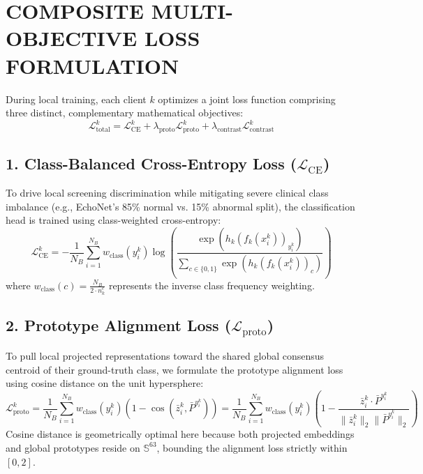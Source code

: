\documentclass[12pt,a4paper]{amritareport}
\begin{document}
\section{COMPOSITE MULTI-OBJECTIVE LOSS FORMULATION}

During local training, each client $k$ optimizes a joint loss function comprising three distinct, complementary mathematical objectives:
\begin{equation}
	\mathcal{L}_{\text{total}}^k = \mathcal{L}_{\text{CE}}^k + \lambda_{\text{proto}} \mathcal{L}_{\text{proto}}^k + \lambda_{\text{contrast}} \mathcal{L}_{\text{contrast}}^k
\end{equation}

\subsection{1. Class-Balanced Cross-Entropy Loss ($\mathcal{L}_{\text{CE}}$)}
To drive local screening discrimination while mitigating severe clinical class imbalance (e.g., EchoNet's 85\% normal vs. 15\% abnormal split), the classification head is trained using class-weighted cross-entropy:
\begin{equation}
	\mathcal{L}_{\text{CE}}^k = - \frac{1}{N_B} \sum_{i=1}^{N_B} w_{\text{class}}(y_i^k) \log \left(\frac{\exp(h_k(f_k(x_i^k))_{y_i^k})}{\sum_{c \in \{0, 1\}} \exp(h_k(f_k(x_i^k))_c)}\right)
\end{equation}
where $w_{\text{class}}(c) = \frac{N_B}{2 \cdot n_k^c}$ represents the inverse class frequency weighting.

\subsection{2. Prototype Alignment Loss ($\mathcal{L}_{\text{proto}}$)}
To pull local projected representations toward the shared global consensus centroid of their ground-truth class, we formulate the prototype alignment loss using cosine distance on the unit hypersphere:
\begin{equation}
	\mathcal{L}_{\text{proto}}^k = \frac{1}{N_B} \sum_{i=1}^{N_B} w_{\text{class}}(y_i^k) \left(1 - \cos(\bar{z}_i^k, \bar{P}^{y_i^k})\right) = \frac{1}{N_B} \sum_{i=1}^{N_B} w_{\text{class}}(y_i^k) \left(1 - \frac{\bar{z}_i^k \cdot \bar{P}^{y_i^k}}{\|\bar{z}_i^k\|_2 \|\bar{P}^{y_i^k}\|_2}\right)
\end{equation}
Cosine distance is geometrically optimal here because both projected embeddings and global prototypes reside on $\mathbb{S}^{63}$, bounding the alignment loss strictly within $[0, 2]$.
\end{document}

